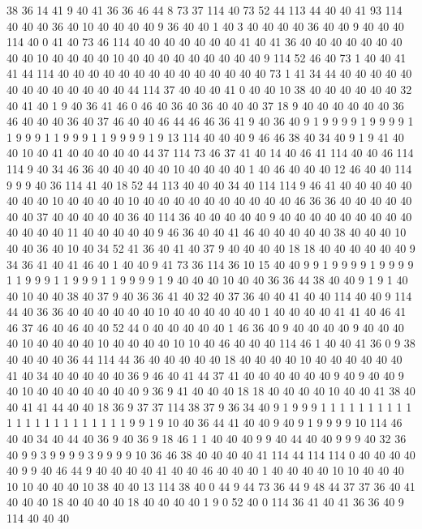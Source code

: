 38 36 14 41 9 40 41 36 36 46 44 8 73 37 114 40 73 52 44 113
44 40 40 41 93 114 40 40 40 36 40 10 40 40 40 40 9 36 40 40
1 40 3 40 40 40 40 36 40 40 9 40 40 40 114 40 0 41 40 73
46 114 40 40 40 40 40 40 40 41 40 41 36 40 40 40 40 40 40 40
40 40 10 40 40 40 40 10 40 40 40 40 40 40 40 40 40 9 114 52
46 40 73 1 40 40 41 41 44 114 40 40 40 40 40 40 40 40 40 40
40 40 40 40 73 1 41 34 44 40 40 40 40 40 40 40 40 40 40 40
40 40 44 114 37 40 40 40 41 0 40 40 10 38 40 40 40 40 40 40
32 40 41 40 1 9 40 36 41 46 0 46 40 36 40 36 40 40 40 37
18 9 40 40 40 40 40 40 36 46 40 40 40 36 40 37 46 40 40 46
44 46 46 36 41 9 40 36 40 9 1 9 9 9 9 1 9 9 9 9
1 1 9 9 9 1 1 9 9 9 1 1 9 9 9 9 1 9 13 114
40 40 40 9 46 46 38 40 34 40 9 1 9 41 40 40 10 40 41 40
40 40 40 40 44 37 114 73 46 37 41 40 14 40 46 41 114 40 40 46
114 114 9 40 34 46 36 40 40 40 40 40 10 40 40 40 40 1 40 46
40 40 40 12 46 40 40 114 9 9 9 40 36 114 41 40 18 52 44 113
40 40 40 34 40 114 114 9 46 41 40 40 40 40 40 40 40 40 10 40
40 40 40 10 40 40 40 40 40 40 40 40 40 40 46 36 36 40 40 40
40 40 40 40 37 40 40 40 40 40 36 40 114 36 40 40 40 40 40 9
40 40 40 40 40 40 40 40 40 40 40 40 40 11 40 40 40 40 40 9
46 36 40 40 41 46 40 40 40 40 40 38 40 40 40 10 40 40 36 40
10 40 34 52 41 36 40 41 40 37 9 40 40 40 40 18 18 40 40 40
40 40 40 9 34 36 41 40 41 46 40 1 40 40 9 41 73 36 114 36
10 15 40 40 9 9 1 9 9 9 9 1 9 9 9 9 1 1 9 9
9 1 1 9 9 9 1 1 9 9 9 9 1 9 40 40 40 10 40 40
36 36 44 38 40 40 9 1 9 1 40 40 10 40 40 38 40 37 9 40
36 36 41 40 32 40 37 36 40 40 41 40 40 114 40 40 9 114 44 40
36 36 40 40 40 40 40 40 10 40 40 40 40 40 40 1 40 40 40 40
41 41 40 46 41 46 37 46 40 46 40 40 52 44 0 40 40 40 40 40
1 46 36 40 9 40 40 40 40 9 40 40 40 40 10 40 40 40 40 10
40 40 40 40 10 10 40 46 40 40 40 114 46 1 40 40 41 36 0 9
38 40 40 40 40 36 44 114 44 36 40 40 40 40 40 18 40 40 40 40
10 40 40 40 40 40 40 41 40 34 40 40 40 40 40 36 9 46 40 41
44 37 41 40 40 40 40 40 40 9 40 9 40 40 9 40 10 40 40 40
40 40 40 40 9 36 9 41 40 40 40 18 18 40 40 40 40 10 40 40
41 38 40 40 41 41 44 40 40 18 36 9 37 37 114 38 37 9 36 34
40 9 1 9 9 9 1 1 1 1 1 1 1 1 1 1 1 1 1 1
1 1 1 1 1 1 1 1 1 9 9 1 9 10 40 36 44 41 40 40
9 40 9 1 9 9 9 9 10 114 46 40 40 34 40 44 40 36 9 40
36 9 18 46 1 1 40 40 40 9 9 40 44 40 40 9 9 9 40 32
36 40 9 9 3 9 9 9 9 3 9 9 9 9 10 36 46 38 40 40
40 40 41 114 44 114 114 0 40 40 40 40 40 9 9 40 46 44 9 40
40 40 40 41 40 40 46 40 40 40 1 40 40 40 40 10 10 40 40 40
10 10 40 40 40 10 38 40 40 13 114 38 40 0 44 9 44 73 36 44
9 48 44 37 37 36 40 41 40 40 40 18 40 40 40 40 18 40 40 40
40 1 9 0 52 40 0 114 36 41 40 41 36 36 40 9 114 40 40 40
